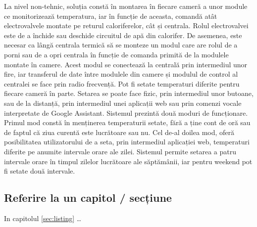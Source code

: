 	La nivel non-tehnic, soluția constă în montarea în fiecare cameră a unor module ce monitorizează temperatura, iar în funcție de aceasta, comandă atât electrovalvele montate pe returul caloriferelor, cât și centrala. Rolul electrovalvei este de a închide sau deschide circuitul de apă din calorifer. De asemenea, este necesar ca lângă centrala termică să se monteze un modul care are rolul de a porni sau de a opri centrala în funcție de comanda primită de la modulele montate în camere. Acest modul se conectează la centrală prin intermediul unor fire, iar transferul de date între modulele din camere și modulul de control al centralei se face prin radio frecvență. Pot fi setate temperaturi diferite pentru fiecare cameră în parte. Setarea se poate face fizic, prin intermediul unor butoane, sau de la distanță, prin intermediul unei aplicații web sau prin comenzi vocale interpretate de Google Assistant. Sistemul prezintă două moduri de funcționare. Primul mod constă în menținerea temperaturii setate, fără a ține cont de oră sau de faptul că ziua curentă este lucrătoare sau nu. Cel de-al doilea mod, oferă posibilitatea utilizatorului de a seta, prin intermediul aplicației web, temperaturi diferite pe anumite intervale orare ale zilei. Sistemul permite setarea a patru intervale orare în timpul zilelor lucrătoare ale săptămânii, iar pentru weekend pot fi setate două intervale.

	 

	


\subsection{Referire la un capitol / secțiune}

In capitolul \ref{sec:listing} \ldots
